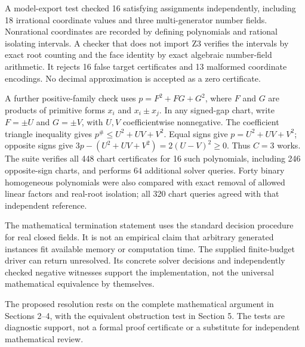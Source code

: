 \documentclass[11pt,a4paper]{article}
\theoremstyle{definition}
\theoremstyle{remark}
\newcommand{\maj}[1]{#1^{\#}}
\begin{document}
A model-export test checked 16 satisfying assignments independently, including
18 irrational coordinate values and three multi-generator number fields.
Nonrational coordinates are recorded by defining polynomials and rational
isolating intervals. A checker that does not import Z3 verifies the intervals
by exact root counting and the face identity by exact algebraic number-field
arithmetic. It rejects 16 false target certificates and 13 malformed coordinate
encodings. No decimal approximation is accepted as a zero certificate.

A further positive-family check uses $p=F^2+FG+G^2$, where $F$ and $G$ are
products of primitive forms $x_i$ and $x_i\pm x_j$. In any signed-gap chart,
write $F=\pm U$ and $G=\pm V$, with $U,V$ coefficientwise nonnegative. The
coefficient triangle inequality gives
$\maj p\le U^2+UV+V^2$. Equal signs give $p=U^2+UV+V^2$; opposite signs give
$3p-(U^2+UV+V^2)=2(U-V)^2\ge0$. Thus $C=3$ works. The suite verifies all 448
chart certificates for 16 such polynomials, including 246 opposite-sign
charts, and performs 64 additional solver queries. Forty binary homogeneous
polynomials were also compared with exact removal of allowed linear factors
and real-root isolation; all 320 chart queries agreed with that independent
reference.

The mathematical termination statement uses the standard decision procedure
for real closed fields. It is not an empirical claim that arbitrary generated
instances fit available memory or computation time. The supplied finite-budget
driver can return unresolved. Its concrete solver decisions and independently
checked negative witnesses support the implementation, not the universal
mathematical equivalence by themselves.

The proposed resolution rests on the complete mathematical argument in
Sections 2--4, with the equivalent obstruction test in Section 5. The tests are diagnostic support, not a formal proof
certificate or a substitute for independent mathematical review.
\end{document}
